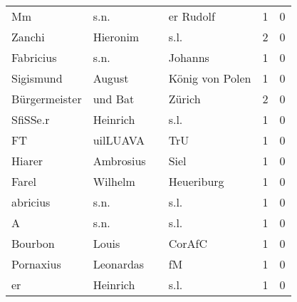 \begin{tabular}{llllrr}
                       Mm &                               s.n. &             &                                   er Rudolf &          1 &         0 \\
                   Zanchi &                           Hieronim &             &                                        s.l. &          2 &         0 \\
                Fabricius &                               s.n. &             &                                     Johanns &          1 &         0 \\
                Sigismund &                             August &             &                             König von Polen &          1 &         0 \\
            Bürgermeister &                            und Bat &             &                                      Zürich &          2 &         0 \\
                 SfiSSe.r &                           Heinrich &             &                                        s.l. &          1 &         0 \\
                       FT &                           uilLUAVA &             &                                         TrU &          1 &         0 \\
                   Hiarer &                          Ambrosius &             &                                        Siel &          1 &         0 \\
                    Farel &                            Wilhelm &             &                                  Heueriburg &          1 &         0 \\
                 abricius &                               s.n. &             &                                        s.l. &          1 &         0 \\
                        A &                               s.n. &             &                                        s.l. &          1 &         0 \\
                  Bourbon &                              Louis &             &                                      CorAfC &          1 &         0 \\
                Pornaxius &                          Leonardas &             &                                          fM &          1 &         0 \\
                       er &                           Heinrich &             &                                        s.l. &          1 &         0 \\

\end{tabular}

